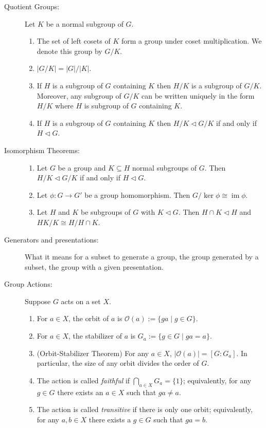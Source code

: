 \documentclass[12pt]{article}
\begin{document}
\begin{description}
\item[Quotient Groups:] Let $K$ be a normal subgroup of $G$.
\begin{enumerate}
\item The set of left cosets of $K$ form a group under coset multiplication.  We denote this group by $G/K$.
\item $|G/K|=|G|/|K|$.
\item If $H$ is a subgroup of $G$ containing $K$ then $H/K$ is a subgroup of $G/K$.  Moreover, any subgroup of $G/K$ can be written uniquely in the form $H/K$ where $H$ is subgroup of $G$ containing $K$.
\item If $H$ is a subgroup of $G$ containing $K$ then $H/K \triangleleft G/K$ if and only if $H\triangleleft G$.  
\end{enumerate}

\item[Isomorphism Theorems:]
\begin{enumerate}  
\item Let $G$ be a group and $K\subseteq H$ normal subgroups of $G$.  Then $H/K \triangleleft G/K$ if and only if $H\triangleleft G$.
\item Let $\phi:G\to G'$ be a group homomorphism.  Then $G/\ker \phi \cong \operatorname{im} \phi$.
\item Let $H$ and $K$ be subgroups of $G$ with $K\triangleleft G$.  Then $H\cap K\triangleleft H$ and $HK/K \cong H/H\cap K$.
\end{enumerate}

\item[Generators and presentations:] What it means for a subset to generate a group, the group generated by a subset, the group with a given presentation.

\item[Group Actions:]  Suppose $G$ acts on a set $X$.
\begin{enumerate}
\item For $a\in X$, the orbit of $a$ is $\mathcal{O}(a):=\{ga \mid g\in G\}$.
\item For $a\in X$, the stabilizer of $a$ is $G_a:=\{g\in G\mid ga=a\}$.
\item (Orbit-Stabilizer Theorem) For any $a\in X$, $|\mathcal{O}(a)|=[G:G_a]$.  In particular, the size of any orbit divides the order of $G$.
\item The action is called {\it faithful} if $\bigcap_{a\in X} G_a=\{1\}$; equivalently, for any $g\in G$ there exists an $a\in X$ such that $ga\neq a$.
\item The action is called {\it transitive} if there is only one orbit; equivalently, for any $a,b\in X$ there exists a $g\in G$ such that $ga=b$.
\end{enumerate}





\end{description}
\end{document}
